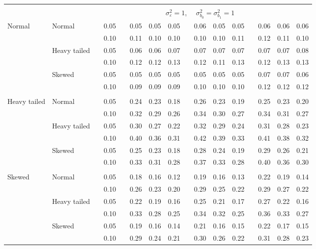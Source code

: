 \documentclass[12pt]{article} %
\begin{document}
\begin{table}[ht]
\begin{scriptsize}
\begin{center}
\begin{tabular}{ll p{.1cm} c p{.1cm} rrr p{.1cm} rrr p{.1cm} rrr}
&&&&&&&&&&&&&&&\\
& && && \multicolumn{9}{c}{$\sigma_{\varepsilon}^2 = 1$, \ \ $\sigma_{b_0}^2 = \sigma_{b_1}^2 = 1$} \\ \cline{6-16}
\rowcolor{gray!20}Normal       & Normal       && 0.05 &&   0.05 & 0.05 & 0.05 && 0.06 & 0.05 & 0.05 &&  0.06 & 0.06 & 0.06 \\
\rowcolor{gray!20}             &              && 0.10 &&   0.11 & 0.10 & 0.10 && 0.10 & 0.10 & 0.11 &&  0.12 & 0.11 & 0.10 \\
\rowcolor{gray!20}             & Heavy tailed && 0.05 &&   0.06 & 0.06 & 0.07 && 0.07 & 0.07 & 0.07 &&  0.07 & 0.07 & 0.08 \\
\rowcolor{gray!20}             &              && 0.10 &&   0.12 & 0.12 & 0.13 && 0.12 & 0.11 & 0.13 &&  0.12 & 0.13 & 0.13 \\
\rowcolor{gray!20}             & Skewed       && 0.05 &&   0.05 & 0.05 & 0.05 && 0.05 & 0.05 & 0.05 &&  0.07 & 0.07 & 0.06 \\
\rowcolor{gray!20}             &              && 0.10 &&   0.09 & 0.09 & 0.09 && 0.10 & 0.10 & 0.10 &&  0.12 & 0.12 & 0.12 \\
             &&&&&&&&&&&&&&&\\
Heavy tailed & Normal       && 0.05 &&   0.24 & 0.23 & 0.18 && 0.26 & 0.23 & 0.19 &&  0.25 & 0.23 & 0.20 \\
             &              && 0.10 &&   0.32 & 0.29 & 0.26 && 0.34 & 0.30 & 0.27 &&  0.34 & 0.31 & 0.27 \\
             & Heavy tailed && 0.05 &&   0.30 & 0.27 & 0.22 && 0.32 & 0.29 & 0.24 &&  0.31 & 0.28 & 0.23 \\
             &              && 0.10 &&   0.40 & 0.36 & 0.31 && 0.42 & 0.39 & 0.33 &&  0.41 & 0.38 & 0.32 \\
             & Skewed       && 0.05 &&   0.25 & 0.23 & 0.18 && 0.28 & 0.24 & 0.19 &&  0.29 & 0.26 & 0.21 \\
             &              && 0.10 &&   0.33 & 0.31 & 0.28 && 0.37 & 0.33 & 0.28 &&  0.40 & 0.36 & 0.30 \\
             &&&&&&&&&&&&&&&\\
Skewed       & Normal       && 0.05 &&   0.18 & 0.16 & 0.12 && 0.19 & 0.16 & 0.13 &&  0.22 & 0.19 & 0.14 \\
             &              && 0.10 &&   0.26 & 0.23 & 0.20 && 0.29 & 0.25 & 0.22 &&  0.29 & 0.27 & 0.22 \\
             & Heavy tailed && 0.05 &&   0.22 & 0.19 & 0.16 && 0.25 & 0.21 & 0.17 &&  0.27 & 0.22 & 0.16 \\
             &              && 0.10 &&   0.33 & 0.28 & 0.25 && 0.34 & 0.32 & 0.25 &&  0.36 & 0.33 & 0.27 \\
             & Skewed       && 0.05 &&   0.19 & 0.16 & 0.14 && 0.21 & 0.16 & 0.15 &&  0.22 & 0.17 & 0.15 \\
             &              && 0.10 &&   0.29 & 0.24 & 0.21 && 0.30 & 0.26 & 0.22 &&  0.31 & 0.28 & 0.23 \\



\end{tabular}
\end{center}
\end{scriptsize}
\end{table}
\end{document}
